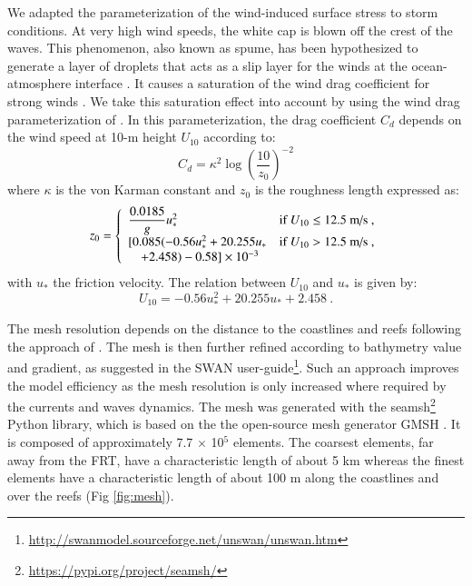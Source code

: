 \documentclass[preprint,12pt,authoryear]{elsarticle}
\begin{document}
We adapted the parameterization of the wind-induced surface stress to storm conditions. At very high wind speeds, the white cap is blown off the crest of the waves. This phenomenon, also known as spume, has been hypothesized to generate a layer of droplets that acts as a slip layer for the winds at the ocean-atmosphere interface \citep{holthuijsen2012wind}. It causes a saturation of the wind drag coefficient for strong winds \citep{powell2003reduced,donelan2004limiting,curcic2020revised}. We take this saturation effect into account by using the wind  drag parameterization of \cite{moon2007physics}. In this parameterization, the drag coefficient $C_d$ depends on the wind speed at 10-m height $U_{10}$ according to:
\begin{equation}
    C_d = \kappa^2 \log\left(\dfrac{10}{z_0}\right)^{-2}\label{eq:drag}
\end{equation}
where $\kappa$ is the von Karman constant and $z_0$ is the roughness length expressed as: 
\begin{equation}
    z_0 =\left\{\begin{array}[]{ll}
        \dfrac{0.0185}{g}u_{\ast}^2 & \text{if }U_{10} \leq 12.5\text{ m/s}~, \\
        \lbrack 0.085(-0.56u_{\ast}^2+20.255u_{\ast} & \text{if }U_{10} > 12.5\text{ m/s}~, \\
        \quad +2.458) - 0.58\rbrack\times 10^{-3} 
    \end{array}\right.
\end{equation}
with $u_\ast$ the friction velocity. The relation between $U_{10}$ and $u_{\ast}$ is given by:
\begin{equation}
    U_{10}=-0.56u_{\ast}^2+20.255u_{\ast}+2.458~.
\end{equation}

The mesh resolution depends on the distance to the coastlines and reefs following the approach of \cite{dobbelaere2020coupled}. The mesh is then further refined according to bathymetry value and gradient, as suggested in the SWAN user-guide\footnote{\url{http://swanmodel.sourceforge.net/unswan/unswan.htm}}. Such an approach improves the model efficiency as the mesh resolution is only increased where required by the currents and waves dynamics. The mesh was generated with the seamsh\footnote{\url{https://pypi.org/project/seamsh/}} Python library, which is based on the the open-source mesh generator GMSH \citep{geuzaine2009gmsh}. It is composed of approximately 7.7 $\times$ 10$^5$ elements. The coarsest elements, far away from the FRT, have a characteristic length of about 5 km whereas the finest elements have a characteristic length of about 100 m along the coastlines and over the reefs (Fig \ref{fig:mesh}).
\end{document}
